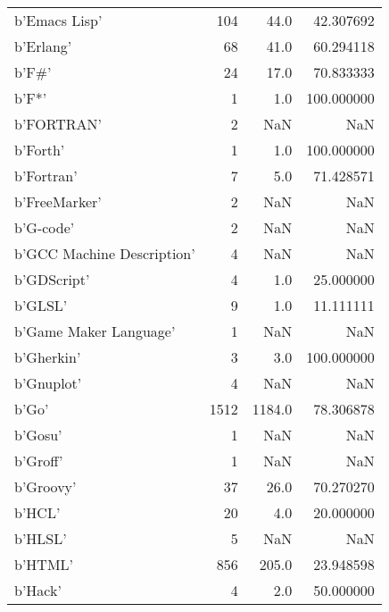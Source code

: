 \begin{table}
\begin{tabular}{lrrr}
b'Emacs Lisp'               &             104 &      44.0 &      42.307692 \\
b'Erlang'                   &              68 &      41.0 &      60.294118 \\
b'F\#'                       &              24 &      17.0 &      70.833333 \\
b'F*'                       &               1 &       1.0 &     100.000000 \\
b'FORTRAN'                  &               2 &       NaN &            NaN \\
b'Forth'                    &               1 &       1.0 &     100.000000 \\
b'Fortran'                  &               7 &       5.0 &      71.428571 \\
b'FreeMarker'               &               2 &       NaN &            NaN \\
b'G-code'                   &               2 &       NaN &            NaN \\
b'GCC Machine Description'  &               4 &       NaN &            NaN \\
b'GDScript'                 &               4 &       1.0 &      25.000000 \\
b'GLSL'                     &               9 &       1.0 &      11.111111 \\
b'Game Maker Language'      &               1 &       NaN &            NaN \\
b'Gherkin'                  &               3 &       3.0 &     100.000000 \\
b'Gnuplot'                  &               4 &       NaN &            NaN \\
b'Go'                       &            1512 &    1184.0 &      78.306878 \\
b'Gosu'                     &               1 &       NaN &            NaN \\
b'Groff'                    &               1 &       NaN &            NaN \\
b'Groovy'                   &              37 &      26.0 &      70.270270 \\
b'HCL'                      &              20 &       4.0 &      20.000000 \\
b'HLSL'                     &               5 &       NaN &            NaN \\
b'HTML'                     &             856 &     205.0 &      23.948598 \\
b'Hack'                     &               4 &       2.0 &      50.000000 \\

\end{tabular}
\end{table}
